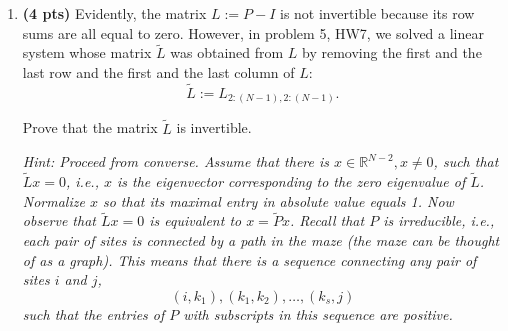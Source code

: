 \documentclass[12pt]{report}
\newenvironment{problem}{}{\newpage}
\begin{document}
\begin{problem}
\begin{enumerate}
    \item \textbf{(4 pts)} Evidently, the matrix $L := P - I$ is not invertible because its row sums are all equal to zero. However, in problem 5, HW7, we solved a linear system whose matrix $\tilde{L}$ was obtained from $L$ by removing the first and the last row and the first and the last column of $L$:
    \begin{equation}
        \tilde{L} := L_{2:(N-1),2:(N-1)}.
    \end{equation}
    
    Prove that the matrix $\tilde{L}$ is invertible.
    
    \textit{Hint: Proceed from converse. Assume that there is $x \in \mathbb{R}^{N-2}, x \neq 0$, such that $\tilde{L}x = 0$, i.e., $x$ is the eigenvector corresponding to the zero eigenvalue of $\tilde{L}$. Normalize $x$ so that its maximal entry in absolute value equals 1. Now observe that $\tilde{L}x = 0$ is equivalent to $x = \tilde{P}x$. Recall that $P$ is irreducible, i.e., each pair of sites is connected by a path in the maze (the maze can be thought of as a graph). This means that there is a sequence connecting any pair of sites $i$ and $j$,}
    \[
    (i, k_1), (k_1, k_2), \ldots, (k_s, j)
    \]
    \textit{such that the entries of $P$ with subscripts in this sequence are positive.}
    
    
\end{enumerate}


\end{problem}
\end{document}
